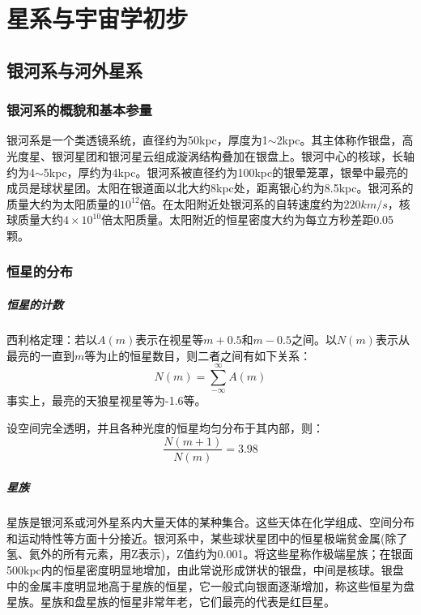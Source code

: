 \chapter{星系与宇宙学初步}
\section{银河系与河外星系}
\subsection{银河系的概貌和基本参量}银河系是一个类透镜系统，直径约为50kpc，厚度为1$\sim$2kpc。其主体称作银盘，高光度星、银河星团和银河星云组成漩涡结构叠加在银盘上。银河中心的核球，长轴约为4$\sim$5kpc，厚约为4kpc。银河系被直径约为100kpc的银晕笼罩，银晕中最亮的成员是球状星团。太阳在银道面以北大约8kpc处，距离银心约为8.5kpc。银河系的质量大约为太阳质量的$10^12$倍。在太阳附近处银河系的自转速度约为$220km/s$，核球质量大约$4\times10^{10}$倍太阳质量。太阳附近的恒星密度大约为每立方秒差距0.05颗。
\subsection{恒星的分布}
\paragraph{恒星的计数}西利格定理：若以$A(m)$表示在视星等$m+0.5$和$m-0.5$之间。以$N(m)$表示从最亮的一直到$m$等为止的恒星数目，则二者之间有如下关系：
\begin{equation}
	N(m)=\sum_{-\infty}^{\infty}A(m)
\end{equation}
事实上，最亮的天狼星视星等为-1.6等。

设空间完全透明，并且各种光度的恒星均匀分布于其内部，则：
\begin{equation}
	\frac{N(m+1)}{N(m)}=3.98
\end{equation}

\paragraph{星族}
星族是银河系或河外星系内大量天体的某种集合。这些天体在化学组成、空间分布和运动特性等方面十分接近。银河系中，某些球状星团中的恒星极端贫金属(除了氢、氦外的所有元素，用Z表示)，Z值约为0.001。将这些星称作极端星族；在银面500kpc内的恒星密度明显地增加，由此常说形成饼状的银盘，中间是核球。银盘中的金属丰度明显地高于星族的恒星，它一般式向银面逐渐增加，称这些恒星为盘星族。星族和盘星族的恒星非常年老，它们最亮的代表是红巨星。

